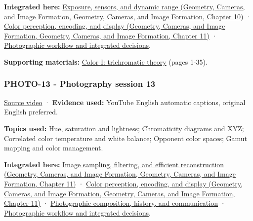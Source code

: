\textbf{Integrated here:} \href{../03-Geometry-Cameras-and-Image-Formation/main.pdf\#nameddest=03-visual-computing-i-ch003-exposure-sensors-and-dynamic-range}{Exposure, sensors, and dynamic range (Geometry, Cameras, and Image Formation, Geometry, Cameras, and Image Formation, Chapter 10)} · \href{../03-Geometry-Cameras-and-Image-Formation/main.pdf\#nameddest=03-visual-computing-i-ch004-color-perception-encoding-and-display}{Color perception, encoding, and display (Geometry, Cameras, and Image Formation, Geometry, Cameras, and Image Formation, Chapter 11)} · \hyperref[04-visual-computing-ii-ch034-photographic-workflow-and-integrated-decisions]{Photographic workflow and integrated decisions}.

\textbf{Supporting materials:} \href{https://drive.google.com/open?id=0B6w2XfPHEcZYekpvMVN6MkdlZ0U}{Color I: trichromatic theory} (pages 1-35).

\subsubsection{PHOTO-13 - Photography session 13}\label{04-visual-computing-ii-ch036-photo-13---photography-session-13}

\href{https://www.youtube.com/watch?v=6T_4mVZcozs}{Source video} · \textbf{Evidence used:} YouTube English automatic captions, original English preferred.

\textbf{Topics used:} Hue, saturation and lightness; Chromaticity diagrams and XYZ; Correlated color temperature and white balance; Opponent color spaces; Gamut mapping and color management.

\textbf{Integrated here:} \href{../03-Geometry-Cameras-and-Image-Formation/main.pdf\#nameddest=03-visual-computing-i-ch004-image-sampling-filtering-and-efficient-reconstruction}{Image sampling, filtering, and efficient reconstruction (Geometry, Cameras, and Image Formation, Geometry, Cameras, and Image Formation, Chapter 11)} · \href{../03-Geometry-Cameras-and-Image-Formation/main.pdf\#nameddest=03-visual-computing-i-ch004-color-perception-encoding-and-display}{Color perception, encoding, and display (Geometry, Cameras, and Image Formation, Geometry, Cameras, and Image Formation, Chapter 11)} · \hyperref[04-visual-computing-ii-ch034-photographic-composition-history-and-communication]{Photographic composition, history, and communication} · \hyperref[04-visual-computing-ii-ch034-photographic-workflow-and-integrated-decisions]{Photographic workflow and integrated decisions}.

